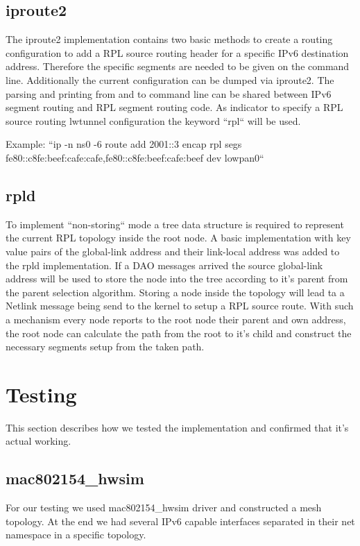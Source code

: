 \documentclass[letterpaper]{article}
\begin{document}
\subsection{iproute2}

The iproute2 implementation contains two basic methods to create a routing
configuration to add a RPL source routing header for a specific IPv6 destination address.
Therefore the specific segments are needed to be given on the command line.
Additionally the current configuration can be dumped via iproute2.
The parsing and printing from and to command line can be shared between IPv6 segment routing and RPL segment routing code.
As indicator to specify a RPL source routing lwtunnel configuration the keyword ``rpl`` will be used.

Example: ``ip -n ns0 -6 route add 2001::3 encap rpl segs fe80::c8fe:beef:cafe:cafe,fe80::c8fe:beef:cafe:beef dev lowpan0``

\subsection{rpld}

To implement ``non-storing`` mode a tree data structure is required to represent the current RPL topology inside the root node.
A basic implementation with key value pairs of the global-link address and their link-local address was added to the rpld implementation.
If a DAO messages arrived the source global-link address will be used to store the node into the tree according to it's parent from the parent selection algorithm.
Storing a node inside the topology will lead ta a Netlink message being send to the kernel to setup a RPL source route.
With such a mechanism every node reports to the root node their parent and own address, the root node can calculate the path from the root to it's child and construct the necessary segments setup from the taken path.

\section{Testing}

This section describes how we tested the implementation and confirmed that it's actual working.

\subsection{mac802154\_hwsim}

For our testing we used mac802154\_hwsim driver and constructed a mesh topology.
At the end we had several IPv6 capable interfaces separated in their net namespace in a specific topology.
\end{document}
